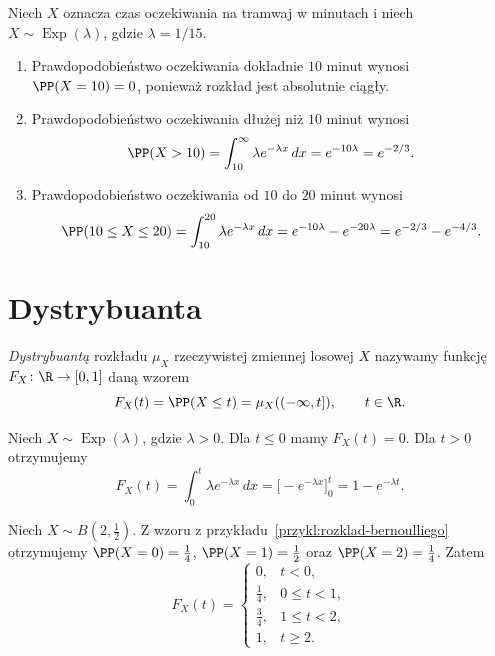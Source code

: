 \begin{przyklad}
\label{przykl:oczekiwanie-na-tramwaj}
Niech $X$ oznacza czas oczekiwania na tramwaj w minutach i niech
$X\sim\operatorname{Exp}(\lambda)$, gdzie $\lambda=1/15$.
\begin{enumerate}[label=\alph*)]
  \item Prawdopodobieństwo oczekiwania dokładnie $10$ minut wynosi
    $\PP(X=10)=0$, ponieważ rozkład jest absolutnie ciągły.
  \item Prawdopodobieństwo oczekiwania dłużej niż $10$ minut wynosi
    \[
      \PP(X>10)=\int_{10}^{\infty}\lambda e^{-\lambda x}\,dx
      =e^{-10\lambda}=e^{-2/3}.
    \]
  \item Prawdopodobieństwo oczekiwania od $10$ do $20$ minut wynosi
    \[
      \PP(10\leq X\leq 20)=\int_{10}^{20}\lambda e^{-\lambda x}\,dx
      =e^{-10\lambda}-e^{-20\lambda}=e^{-2/3}-e^{-4/3}.
    \]
\end{enumerate}
\end{przyklad}

\section{Dystrybuanta}
\label{sec:dystrybuanta}

\begin{definicja}
\label{def:dystrybuanta}
\emph{Dystrybuantą} rozkładu $\mu_X$ rzeczywistej zmiennej losowej $X$
nazywamy funkcję $F_X\colon\R\to[0,1]$ daną wzorem
\[
  F_X(t)=\PP(X\leq t)=\mu_X((-\infty,t]),\qquad t\in\R.
\]
\end{definicja}

\begin{przyklad}
\label{przykl:dystrybuanta-wykladnicza}
Niech $X\sim\operatorname{Exp}(\lambda)$, gdzie $\lambda>0$.
Dla $t\leq 0$ mamy $F_X(t)=0$. Dla $t>0$ otrzymujemy
\[
  F_X(t)=\int_0^t\lambda e^{-\lambda x}\,dx
        =\bigl[-e^{-\lambda x}\bigr]_{0}^{t}
        =1-e^{-\lambda t}.
\]
\end{przyklad}

\begin{przyklad}
\label{przykl:dystrybuanta-dwumianowa}
Niech $X\sim B(2,\tfrac12)$. Z wzoru z przykładu~\ref{przykl:rozklad-bernoulliego}
otrzymujemy $\PP(X=0)=\tfrac14$, $\PP(X=1)=\tfrac12$
oraz $\PP(X=2)=\tfrac14$. Zatem
\[
  F_X(t)=
  \begin{cases}
    0, & t<0,\\
    \tfrac14, & 0\leq t<1,\\
    \tfrac34, & 1\leq t<2,\\
    1, & t\geq 2.
  \end{cases}
\]
\end{przyklad}

